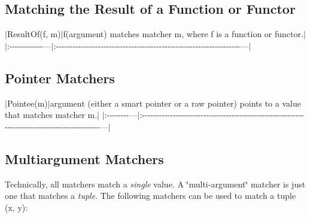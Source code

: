 \subsection*{Matching the Result of a Function or Functor}

$\vert${\ttfamily Result\+Of(f, m)}$\vert${\ttfamily f(argument)} matches matcher {\ttfamily m}, where {\ttfamily f} is a function or functor.$\vert$ $\vert$\+:-\/-\/-\/-\/-\/-\/-\/-\/-\/-\/-\/-\/---$\vert$\+:-\/-\/-\/-\/-\/-\/-\/-\/-\/-\/-\/-\/-\/-\/-\/-\/-\/-\/-\/-\/-\/-\/-\/-\/-\/-\/-\/-\/-\/-\/-\/-\/-\/-\/-\/-\/-\/-\/-\/-\/-\/-\/-\/-\/-\/-\/-\/-\/-\/-\/-\/-\/-\/-\/-\/-\/-\/-\/-\/-\/-\/-\/-\/-\/-\/-\/---$\vert$

\subsection*{Pointer Matchers}

$\vert${\ttfamily Pointee(m)}$\vert${\ttfamily argument} (either a smart pointer or a raw pointer) points to a value that matches matcher {\ttfamily m}.$\vert$ $\vert$\+:-\/-\/-\/-\/-\/-\/-\/-\/---$\vert$\+:-\/-\/-\/-\/-\/-\/-\/-\/-\/-\/-\/-\/-\/-\/-\/-\/-\/-\/-\/-\/-\/-\/-\/-\/-\/-\/-\/-\/-\/-\/-\/-\/-\/-\/-\/-\/-\/-\/-\/-\/-\/-\/-\/-\/-\/-\/-\/-\/-\/-\/-\/-\/-\/-\/-\/-\/-\/-\/-\/-\/-\/-\/-\/-\/-\/-\/-\/-\/-\/-\/-\/-\/-\/-\/-\/-\/-\/-\/-\/-\/-\/-\/-\/-\/-\/-\/-\/-\/-\/-\/-\/-\/---$\vert$

\subsection*{Multiargument Matchers}

Technically, all matchers match a {\itshape single} value. A \char`\"{}multi-\/argument\char`\"{} matcher is just one that matches a {\itshape tuple}. The following matchers can be used to match a tuple {\ttfamily (x, y)}\+:

